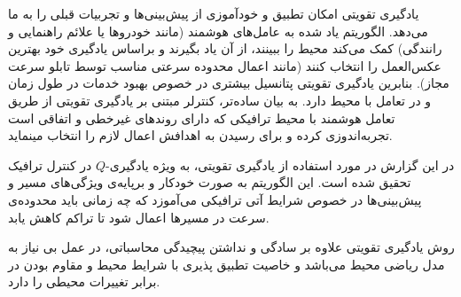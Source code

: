 یادگیری تقویتی امکان تطبیق و خودآموزی از پیش‌بینی‌ها و تجربیات قبلی را به ما می‌دهد. الگوریتم یاد شده به عامل‌های هوشمند (مانند خودروها یا علائم راهنمایی و رانندگی) کمک می‌کند محیط را ببینند، از آن یاد بگیرند و براساس یادگیری خود بهترین عکس‌العمل را انتخاب کنند (مانند اعمال محدوده سرعتی مناسب توسط تابلو سرعت مجاز). بنابرین یادگیری تقویتی پتانسیل بیشتری در خصوص بهبود خدمات در طول زمان و در تعامل با محیط دارد.
به بيان ساده‌تر، کنترلر مبتنی بر يادگيری تقويتی از طريق
تعامل هوشمند با محيط ترافيكی که دارای روندهای غيرخطی و اتفاقی است تجربه‌اندوزی کرده و برای رسيدن به اهدافش اعمال لازم را
انتخاب مینمايد.

در این گزارش در مورد استفاده از یادگیری تقویتی، به ویژه یادگیری-$Q$ در کنترل ترافیک تحقیق شده است.
این الگوریتم به صورت خودکار و برپایه‌ی ویژگی‌های مسیر و پیش‌بینی‌ها در خصوص شرایط آتی ترافیکی می‌آموزد که چه زمانی باید محدوده‌ی سرعت در مسیرها اعمال شود تا تراکم کاهش یابد.

روش یادگیری تقویتی علاوه بر سادگی و نداشتن پیچیدگی محاسباتی، در عمل بی نیاز به مدل ریاضی محیط می‌باشد و خاصیت تطبیق پذیری با شرایط محیط و مقاوم بودن در برابر تغییرات محیطی را دارد.	